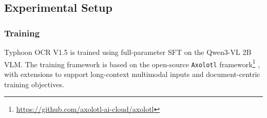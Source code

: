 \documentclass[]{typhoon} %
\begin{document}





\subsection{Experimental Setup}
\subsubsection{Training}

Typhoon OCR V1.5 is trained using full-parameter SFT on the Qwen3-VL 2B VLM. The training framework is based on the open-source \texttt{Axolotl} framework\footnote{\url{https://github.com/axolotl-ai-cloud/axolotl}} \citep{axolotl}, with extensions to support long-context multimodal inputs and document-centric training objectives.
\end{document}

